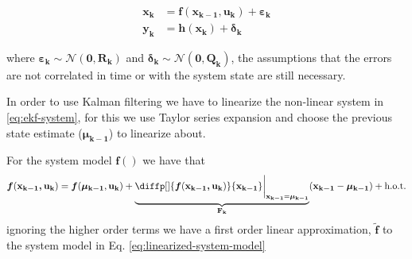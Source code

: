 \documentclass[12pt]{article}
\newcommand{\bvec}[1]{\boldsymbol{\mathbf{#1}}} %
\newcommand{\mat}[1]{\boldsymbol{\mathbf{#1}}}
\newcommand{\parentheses}[1]{\left(#1\right)}
\newcommand{\mb}[1]{{\boldsymbol{#1}}} %
\newcommand{\normal}[2]{\mathcal{N}\parentheses{#1, #2}}
\newcommand{\hot}{\text{h.o.t.}}
\begin{document}
\begin{equation}
\begin{aligned}
    \bvec{x_k} &= \mb{f}(\bvec{x_{k-1}, u_k}) + \mb{\varepsilon}_\mathbf{k} \\
    \bvec{y_k} &= \mb{h}(\bvec{x_{k}}) + \mb{\delta}_\mathbf{k}
\end{aligned}
    \label{eq:ekf-system}
\end{equation}

where $\mb{\varepsilon}_\mathbf{k} \sim \normal{\bvec{0}}{\bvec{R_k}}$ and $\mb{\delta}_\mathbf{k} \sim \normal{\bvec{0}}{\bvec{Q_k}}$, the assumptions that the errors are not correlated in time or with the system state are still necessary.

In order to use Kalman filtering we have to linearize the non-linear system in \ref{eq:ekf-system}, for this we use Taylor series expansion and choose the previous state estimate ($\bvec{\mu_{k-1}}$) to linearize about.

For the system model $\mb{f}()$ we have that
\begin{equation*}
    \mb{f}(\bvec{x_{k-1}, u_k}) = \mb{f}(\bvec{\mu_{k-1}}, 
    \bvec{u_k}) + \underbrace{\diffp[]{\mb{f}(\bvec{x_{k-1}, u_k}) }
    {\bvec{x_{k-1}}}\bigg\rvert_{\bvec{x_{k-1}} = \bvec{\mu_{k-1}}}}_{\mat{F_k}} 
    (\bvec{x_{k-1}} - \bvec{\mu_{k-1}}) + \hot
\end{equation*}
ignoring the higher order terms we have a first order linear approximation, $\mb{\tilde{f}}$ to the system model in Eq. \ref{eq:linearized-system-model}
\end{document}
